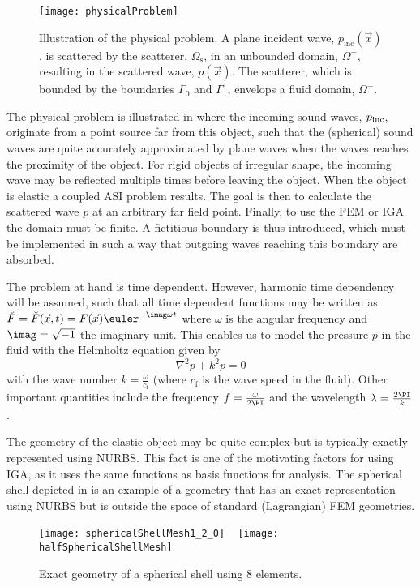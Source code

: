 \begin{figure}
	\centering
	\texttt{[image: physicalProblem]}
	\caption[Illustration of the physical problem]{Illustration of the physical problem. A plane incident wave, $p_{\mathrm{inc}}(\vec{x})$, is scattered by the scatterer, $\Omega_{\mathrm{s}}$, in an unbounded domain, $\Omega^+$, resulting in the scattered wave, $p(\vec{x})$. The scatterer, which is bounded by the boundaries $\Gamma_0$ and $\Gamma_1$, envelops a fluid domain, $\Omega^-$.}
	\label{Fig2:physicalProblem}
\end{figure}
The physical problem is illustrated in  where the incoming sound waves, $p_{\rm inc}$, originate from a point source far from this object, such that the (spherical) sound waves are quite accurately approximated by plane waves when the waves reaches the proximity of the object. For rigid objects of irregular shape, the incoming wave may be reflected multiple times before leaving the object. When the object is elastic a coupled ASI problem results. The goal is then to calculate the scattered wave $p$ at an arbitrary far field point. Finally, to use the FEM or IGA the domain must be finite. A fictitious boundary is thus introduced, which must be implemented in such a way that outgoing waves reaching this boundary are absorbed.


The problem at hand is time dependent. However, harmonic time dependency will be assumed, such that all time dependent functions may be written as ${\breve{F}=\breve{F}(\vec{x},t) = F(\vec{x})\euler^{-\imag\omega t}}$ where $\omega$ is the angular frequency and $\imag = \sqrt{-1}$ the imaginary unit. This enables us to model the pressure $p$ in the fluid with the Helmholtz equation given by
\begin{equation}\label{Eq2:HelmholtzEquationIntro}
	\nabla^2 p + k^2 p = 0
\end{equation}
with the wave number $k=\frac{\omega}{c_{\mathrm{f}}}$ (where $c_{\mathrm{f}}$ is the wave speed in the fluid). Other important quantities include the frequency $f=\frac{\omega}{2\PI}$ and the wavelength $\lambda = \frac{2\PI}{k}$.

The geometry of the elastic object may be quite complex but is typically exactly represented using NURBS. This fact is one of the motivating factors for using IGA, as it uses the same functions as basis functions for analysis. The spherical shell depicted in  is an example of a geometry that has an exact representation using NURBS but is outside the space of standard (Lagrangian) FEM geometries.
\begin{figure}
	\centering
	\texttt{[image: sphericalShellMesh1\_2\_0]}
	~
	\texttt{[image: halfSphericalShellMesh]}
	\caption[Exact geometry of a spherical shell using 8 elements]{Exact geometry of a spherical shell using 8 elements.}
	\label{Fig2:SphericalShell}
\end{figure}

